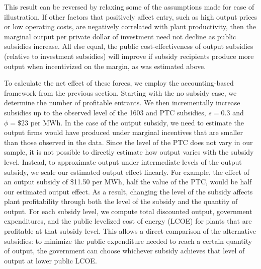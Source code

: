 \documentclass[12pt]{article}
\begin{document}
This result can be reversed by relaxing some of the assumptions made for ease of illustration. If other factors that positively affect entry, such as high output prices or low operating costs, are negatively correlated with plant productivity, then the marginal output per private dollar of investment need not decline as public subsidies increase. All else equal, the public cost-effectiveness of output subsidies (relative to investment subsidies) will improve if subsidy recipients produce more output when incentivized on the margin, as was estimated above. 

To calculate the net effect of these forces, we employ the accounting-based framework from the previous section. Starting with the no subsidy case, we determine the number of profitable entrants. We then incrementally increase subsidies up to the observed level of the 1603 and PTC subsidies, $s=0.3$ and $\phi=\$23$ per MWh. In the case of the output subsidy, we need to estimate the output firms would have produced under marginal incentives that are smaller than those observed in the data. Since the level of the PTC does not vary in our sample, it is not possible to directly estimate how output varies with the subsidy level. Instead, to approximate output under intermediate levels of the output subsidy, we scale our estimated output effect linearly. For example, the effect of an output subsidy of \$11.50 per MWh, half the value of the PTC, would be half our estimated output effect. As a result, changing the level of the subsidy affects plant profitability through both the level of the subsidy and the quantity of output. For each subsidy level, we compute total discounted output, government expenditures, and the public levelized cost of energy (LCOE) for plants that are profitable at that subsidy level. This allows a direct comparison of the alternative subsidies: to minimize the public expenditure needed to reach a certain quantity of output, the government can choose whichever subsidy achieves that level of output at lower public LCOE.
\end{document}
